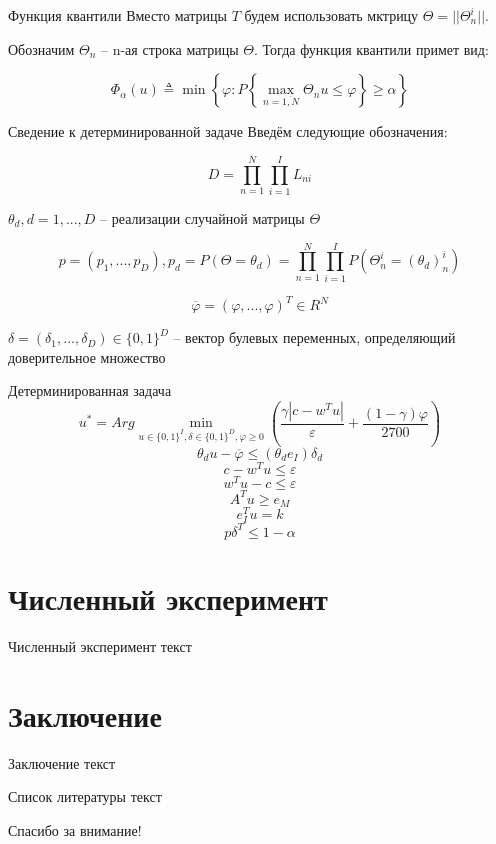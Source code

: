\documentclass[aspectratio=169]{beamer}
\begin{document}
    
    \begin{frame}{Функция квантили}
        Вместо матрицы $T$ будем использовать мктрицу $\Theta=||\Theta_n^i||$.
        
        Обозначим $\Theta_n$ -- n-ая строка матрицы $\Theta$. Тогда функция квантили примет вид:
        
        $$\Phi_\alpha(u)\triangleq\min\left\{\varphi:P\left\{\max_{n=\overline{1,N}}\Theta_n u\leq\varphi\right\}\geq\alpha\right\}$$
    \end{frame}
    
    
    \begin{frame}{Сведение к детерминированной задаче}
        Введём следующие обозначения:
        
        $$D=\prod_{n=1}^N\prod_{i=1}^I L_{ni}$$
        
        $\theta_d, d=1,...,D$ -- реализации случайной матрицы $\Theta$
        
        $$p=(p_1,...,p_D), p_d = P(\Theta=\theta_d)=\prod_{n=1}^N\prod_{i=1}^I P(\Theta_n^i=(\theta_d)_n^i)$$
        
        $$\overline{\varphi}=(\varphi,...,\varphi)^T\in R^N$$
        
        $\delta=(\delta_1,...,\delta_D)\in\{0,1\}^D$ -- вектор булевых переменных, определяющий доверительное множество
    \end{frame}
    
    
    \begin{frame}{Детерминированная задача}
        $$u^* = Arg\min_{u\in\{0, 1\}^I, \delta\in\{0, 1\}^D, \varphi\geq 0}\left(\frac{\gamma\left|c-w^T u\right|}{\varepsilon} + \frac{(1-\gamma)\varphi}{2700}\right)$$
        $$\theta_d u - \overline{\varphi}\leq(\theta_d e_I)\delta_d$$
        $$c-w^T u\leq\varepsilon$$
        $$w^T u-c\leq\varepsilon$$
        $$A^T u\geq e_M$$
        $$e_I^T u=k$$
        $$p\delta^T \leq 1-\alpha$$
    \end{frame}


    \section{Численный эксперимент}
    \begin{frame}{Численный эксперимент}
        текст\\
    \end{frame}


    \section{Заключение}
    \begin{frame}{Заключение}
        текст\\
    \end{frame}

    
    \begin{frame}{Список литературы}
        текст\\
    \end{frame}


    \begin{frame}
        \centering
        \huge
        Спасибо за внимание!\\
    \end{frame}
\end{document}
